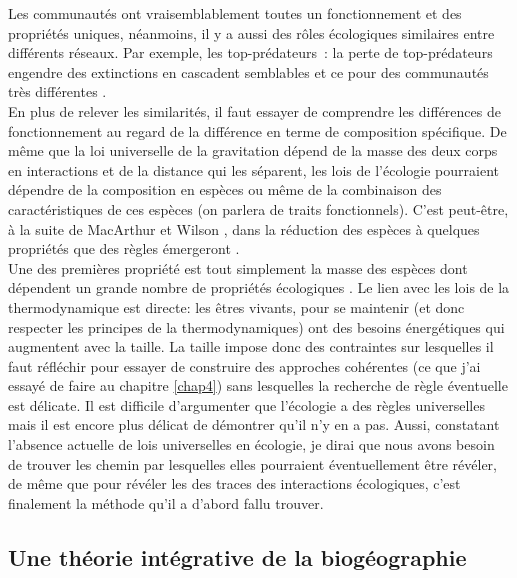Les communautés ont vraisemblablement toutes un fonctionnement et des
propriétés uniques, néanmoins, il y a aussi des rôles écologiques
similaires entre différents réseaux. Par exemple, les top-prédateurs~:
la perte de top-prédateurs engendre des extinctions en cascadent
semblables et ce pour des communautés très différentes
\citep{Terborgh2001, Sinclair2003a, Myers2007, Ripple2014}.\\
En plus de relever les similarités, il faut essayer de comprendre les
différences de fonctionnement au regard de la différence en terme de
composition spécifique. De même que la loi universelle de la gravitation
dépend de la masse des deux corps en interactions et de la distance qui
les séparent, les lois de l'écologie pourraient dépendre de la
composition en espèces ou même de la combinaison des caractéristiques de
ces espèces (on parlera de traits fonctionnels). C'est peut-être, à la
suite de MacArthur et Wilson \citep{MacArthur1967}, dans la réduction
des espèces à quelques propriétés que des règles émergeront
\citep{McGill2006, Poisot2015}.\\
Une des premières propriété est tout simplement la masse des espèces
dont dépendent un grande nombre de propriétés écologiques
\citep{Woodward2005a}. Le lien avec les lois de la thermodynamique est
directe: les êtres vivants, pour se maintenir (et donc respecter les
principes de la thermodynamiques) ont des besoins énergétiques qui
augmentent avec la taille. La taille impose donc des contraintes sur
lesquelles il faut réfléchir pour essayer de construire des approches
cohérentes (ce que j'ai essayé de faire au chapitre \ref{chap4}) sans
lesquelles la recherche de règle éventuelle est délicate. Il est
difficile d'argumenter que l'écologie a des règles universelles mais il
est encore plus délicat de démontrer qu'il n'y en a pas. Aussi,
constatant l'absence actuelle de lois universelles en écologie, je dirai
que nous avons besoin de trouver les chemin par lesquelles elles
pourraient éventuellement être révéler, de même que pour révéler les des
traces des interactions écologiques, c'est finalement la méthode qu'il a
d'abord fallu trouver.

\subsection*{Une théorie intégrative de la
biogéographie}\label{une-thuxe9orie-intuxe9grative-de-la-bioguxe9ographie}


